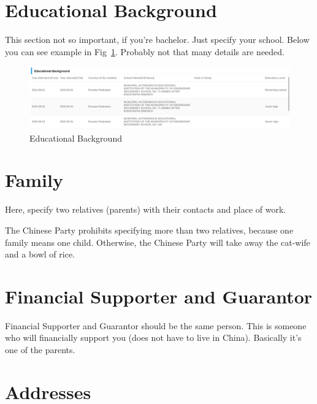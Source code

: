 \section{Educational Background}\label{sec:ru_edu}

This section not so important, if you're bachelor.
Just specify your school.
Below you can see example in Fig~\ref{fig:ru_edu_back}.
Probably not that many details are needed.


\begin{figure}[H]
    \centering
    \includegraphics[width=\textwidth]{01_russia/imgs/app_edu_back}
    \caption{\centering Educational Background}
    \label{fig:ru_edu_back}
\end{figure}







\section{Family}\label{sec:ru_family}
Here, specify two relatives (parents)
with their contacts and place of work.


\begin{joke}
The Chinese Party prohibits specifying more than two relatives,
because one family means one child.
Otherwise, the Chinese Party will take away the
cat-wife and a bowl of rice.
\end{joke}





\section{Financial Supporter and Guarantor}\label{sec:ru_fin_supp}
Financial Supporter and Guarantor should be the same person.
This is someone who will financially support you (does not have to live in China).
Basically it's one of the parents.





\section{Addresses}\label{sec:ru_addr}

